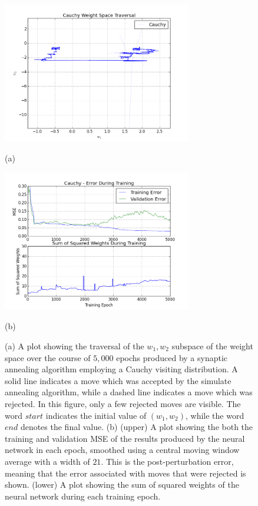 \documentclass[11pt]{afthesis}
\begin{document}
  	\begin{figure}[ht!]
  		
  		\begin{minipage}[b]{0.5\linewidth}
  			\centering
  			\centerline{\includegraphics[width = 3.25in]{figures/weight_space_cauchy.png}}
 			\centerline{(a)}\medskip
  		\end{minipage}
  		\hfill
  		\begin{minipage}[b]{0.5\linewidth}
  			\centering
  			\centerline{\includegraphics[width = 3.25in]{figures/weight_space_cauchy_perf.png}}
  			\centerline{(b)}\medskip
  		\end{minipage}
  		\caption{
  			(a) A plot showing the traversal of the $w_1,w_2$ subspace of the weight space over the course of $5,000$ epochs produced by a synaptic annealing algorithm employing a Cauchy visiting distribution. A solid line indicates a move which was accepted by the simulate annealing algorithm, while a dashed line indicates a move which was rejected. In this figure, only a few rejected moves are visible. The word $start$ indicates the initial value of $(w_1,w_2)$, while the word $end$ denotes the final value. 
  			(b) (upper) A plot showing the both the training and validation MSE of the results produced by the neural network in each epoch, smoothed using a central moving window average with a width of $21$. This is the post-perturbation error, meaning that the error associated with moves that were rejected is shown. (lower) A plot showing the sum of squared weights of the neural network during each training epoch.}
  		\label{fig:weight_space_cauchy}
  		
  	\end{figure}
  	
\end{document}
